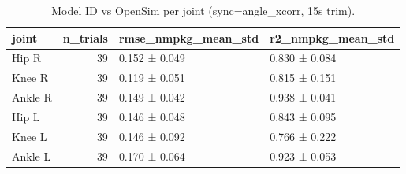 \begin{table}
\caption{Model ID vs OpenSim per joint (sync=angle_xcorr, 15s trim).}
\label{tab:table1_id_per_joint}
\begin{tabular}{lrll}
\toprule
joint & n\_trials & rmse\_nmpkg\_mean\_std & r2\_nmpkg\_mean\_std \\
\midrule
Hip R & 39 & 0.152 ± 0.049 & 0.830 ± 0.084 \\
Knee R & 39 & 0.119 ± 0.051 & 0.815 ± 0.151 \\
Ankle R & 39 & 0.149 ± 0.042 & 0.938 ± 0.041 \\
Hip L & 39 & 0.146 ± 0.048 & 0.843 ± 0.095 \\
Knee L & 39 & 0.146 ± 0.092 & 0.766 ± 0.222 \\
Ankle L & 39 & 0.170 ± 0.064 & 0.923 ± 0.053 \\
\bottomrule
\end{tabular}
\end{table}
